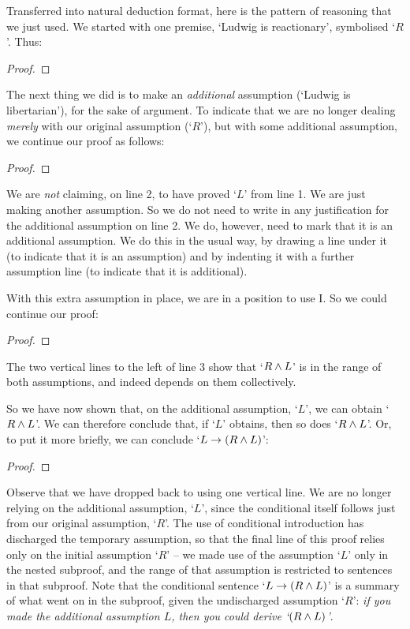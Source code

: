 Transferred into natural deduction format, here is the pattern of reasoning that we just used. We started with one premise, `Ludwig is reactionary', symbolised `$R$'. Thus:
	\begin{proof}
	\end{proof}
The next thing we did is to make an \emph{additional} assumption (`Ludwig is libertarian'), for the sake of argument. To indicate that we are no longer dealing \emph{merely} with our original assumption (`$R$'), but with some additional assumption, we continue our proof as follows:
	\begin{proof}
		\open
	\end{proof}
We are \emph{not} claiming, on line 2, to have proved `$L$' from line 1. We are just making another assumption. So we do not need to write in any justification for the additional assumption on line 2. We do, however, need to mark that it is an additional assumption. We do this in the usual way, by drawing a line under it (to indicate that it is an assumption) and by indenting it with a further assumption line (to indicate that it is additional). 

With this extra assumption in place, we are in a position to use {\eand}I. So we could continue our proof:
	\begin{proof}
		\open
	\end{proof} The two vertical lines to the left of line 3 show that `$R\wedge L$' is in the range of both assumptions, and indeed depends on them collectively.

So we have now shown that, on the additional assumption, `$L$', we can obtain `$R \wedge L$'. We can therefore conclude that, if `$L$' obtains, then so does `$R \wedge L$'. Or, to put it more briefly, we can conclude `$L \rightarrow (R \wedge L)$':
	\begin{proof}
		\open
			\close
	\end{proof}
Observe that we have dropped back to using one vertical line.  We are no longer relying on the additional assumption, `$L$', since the conditional itself follows just from our original assumption, `$R$'. The use of conditional introduction has discharged the temporary assumption, so that the final line of this proof relies only on the initial assumption `$R$' – we made use of the assumption `$L$' only in the nested subproof, and the range of that assumption is restricted to sentences in that subproof. Note that the conditional sentence `$L \rightarrow (R \wedge L)$' is a summary of what went on in the subproof, given the undischarged assumption `$R$': \emph{if you made the additional assumption $L$, then you could derive `$(R \wedge L)$'}.


